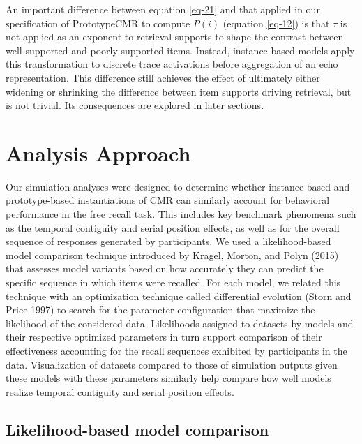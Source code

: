 \documentclass[
  letterpaper,
  DIV=11]{article}
\begin{document}
An important difference between equation \ref{eq-21} and that applied in
our specification of PrototypeCMR to compute \(P(i)\) (equation
\ref{eq-12}) is that \(\tau\) is not applied as an exponent to retrieval
supports to shape the contrast between well-supported and poorly
supported items. Instead, instance-based models apply this
transformation to discrete trace activations before aggregation of an
echo representation. This difference still achieves the effect of
ultimately either widening or shrinking the difference between item
supports driving retrieval, but is not trivial. Its consequences are
explored in later sections.

\hypertarget{analysis-approach}{%
\section{Analysis Approach}\label{analysis-approach}}

Our simulation analyses were designed to determine whether
instance-based and prototype-based instantiations of CMR can similarly
account for behavioral performance in the free recall task. This
includes key benchmark phenomena such as the temporal contiguity and
serial position effects, as well as for the overall sequence of
responses generated by participants. We used a likelihood-based model
comparison technique introduced by Kragel, Morton, and Polyn (2015) that
assesses model variants based on how accurately they can predict the
specific sequence in which items were recalled. For each model, we
related this technique with an optimization technique called
differential evolution (Storn and Price 1997) to search for the
parameter configuration that maximize the likelihood of the considered
data. Likelihoods assigned to datasets by models and their respective
optimized parameters in turn support comparison of their effectiveness
accounting for the recall sequences exhibited by participants in the
data. Visualization of datasets compared to those of simulation outputs
given these models with these parameters similarly help compare how well
models realize temporal contiguity and serial position effects.

\hypertarget{likelihood-based-model-comparison}{%
\subsection{Likelihood-based model
comparison}\label{likelihood-based-model-comparison}}
\end{document}
